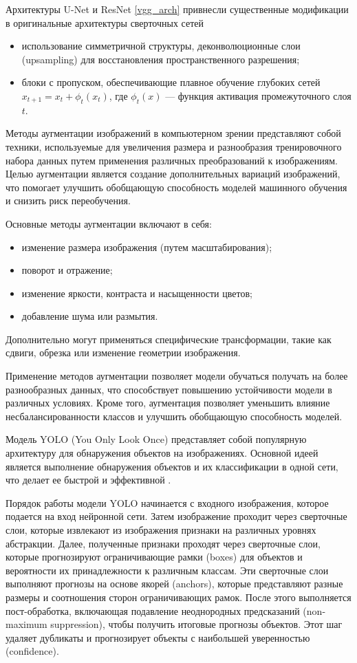 Архитектуры U-Net и ResNet \ref{vgg_arch} привнесли существенные модификации в оригинальные архитектуры сверточных сетей 
\begin{itemize}
    \item использование симметричной структуры, деконволюционные слои (upsampling) для восстановления пространственного разрешения;
    \item блоки с пропуском, обеспечивающие плавное обучение глубоких сетей  $x_{t+1} = x_t + \phi_t(x_t)$, где $\phi_t(x)$ --- функция активация промежуточного слоя $t$.
\end{itemize}

Методы аугментации изображений в компьютерном зрении представляют собой техники, используемые для увеличения размера и разнообразия тренировочного набора данных путем
применения различных преобразований к изображениям. Целью аугментации является создание дополнительных вариаций изображений, что помогает улучшить обобщающую способность
моделей машинного обучения и снизить риск переобучения.

Основные методы аугментации включают в себя:
\begin{itemize}
    \item изменение размера изображения (путем масштабирования);
    \item поворот и отражение; 
    \item изменение яркости, контраста и насыщенности цветов;
    \item добавление шума или размытия.
\end{itemize}    
    
Дополнительно могут применяться специфические трансформации, такие как сдвиги, обрезка или изменение геометрии изображения.

Применение методов аугментации позволяет модели обучаться получать на более разнообразных данных, 
что способствует повышению устойчивости модели в различных условиях. Кроме того, аугментация позволяет уменьшить влияние 
несбалансированности классов и улучшить обобщающую способность моделей.

Модель YOLO (You Only Look Once) представляет собой популярную архитектуру для обнаружения объектов на изображениях. 
Основной идеей является выполнение обнаружения объектов и их классификации в одной сети, что делает ее быстрой и эффективной \cite{kirillov2023segment}.

Порядок работы модели YOLO начинается с входного изображения, которое подается на вход нейронной сети. Затем изображение проходит через сверточные слои, которые извлекают 
из изображения признаки на различных уровнях абстракции. Далее, полученные признаки проходят через сверточные слои, которые прогнозируют ограничивающие рамки (boxes) для объектов 
и вероятности их принадлежности к различным классам. Эти сверточные слои выполняют прогнозы на основе якорей (anchors), которые представляют разные размеры и соотношения 
сторон ограничивающих рамок. После этого выполняется пост-обработка, включающая подавление неоднородных предсказаний (non-maximum suppression), чтобы получить итоговые прогнозы объектов. 
Этот шаг удаляет дубликаты и прогнозирует объекты с наибольшей уверенностью (confidence).

